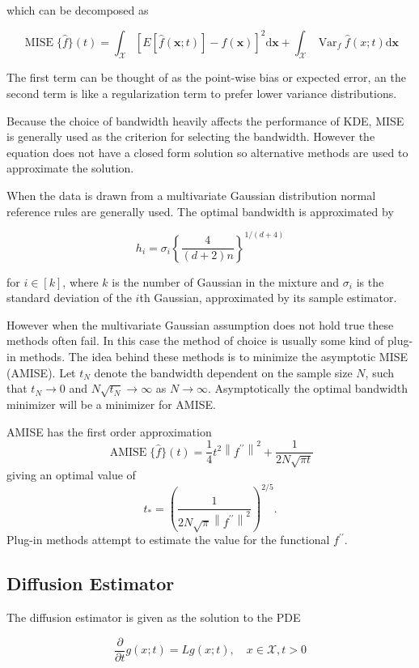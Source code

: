 which can be decomposed as 

$$
\operatorname{MISE}\{\hat{f}\}(t)= \int_{\mathscr{X}} \left[E[\hat{f}(\boldsymbol{x}; t)]-f(\boldsymbol{x})\right]^{2} \mathrm{d} \boldsymbol{x} + \int_{\mathscr{X}} \operatorname{Var}_f\hat{f}(x; t) \mathrm{d} \boldsymbol{x} 
$$

The first term can be thought of as the point-wise bias or expected error, an the second term is like a regularization term to prefer lower variance distributions. 

Because the choice of bandwidth heavily affects the performance of KDE, MISE is generally used as the criterion for selecting the bandwidth. However the equation does not have a closed form solution so alternative methods are used to approximate the solution.

When the data is drawn from a multivariate Gaussian distribution normal reference rules are generally used. The optimal bandwidth is approximated by

$$
h_{i}=\sigma_{i}\left\{\frac{4}{(d+2) n}\right\}^{1 /(d+4)}
$$

for $i \in [k]$, where $k$ is the number of Gaussian in the mixture and $\sigma_i$ is the standard deviation of the $i$th Gaussian, approximated by its sample estimator.

However when the multivariate Gaussian assumption does not hold true these methods often fail. In this case the method of choice is usually some kind of plug-in methods. The idea behind these methods is to minimize the asymptotic MISE (AMISE). Let $t_N$ denote the bandwidth dependent on the sample size $N$, such that $t_N \rightarrow 0$ and $N\sqrt{t_N} \rightarrow \infty$ as $N \rightarrow \infty$. Asymptotically the optimal bandwidth minimizer will be a minimizer for AMISE. 

AMISE has the first order approximation
$$
\operatorname{AMISE}\{\hat{f}\}(t)=\frac{1}{4} t^{2}\left\|f^{\prime \prime}\right\|^{2}+\frac{1}{2 N \sqrt{\pi t}}
$$
giving an optimal value of
$$
t_{*}=\left(\frac{1}{2 N \sqrt{\pi}\left\|f^{\prime \prime}\right\|^{2}}\right)^{2 / 5}.
$$
Plug-in methods attempt to estimate the value for the functional $f^{\prime\prime}$.


\subsection{Diffusion Estimator}
The diffusion estimator is given as the solution to the PDE

\begin{equation}
\frac{\partial}{\partial t} g(x ; t)=L g(x ; t), \quad x \in \mathscr{X}, t>0
\end{equation}

